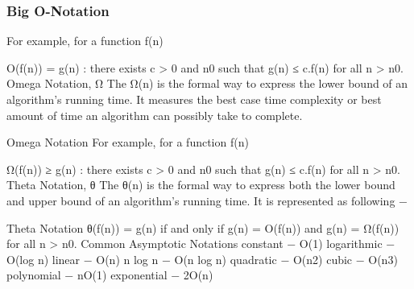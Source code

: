 \documentclass{beamer}
\begin{document}
\begin{frame}
\frametitle{Big O-Notation}
For example, for a function f(n)

Ο(f(n)) = { g(n) : there exists c > 0 and n0 such that g(n) ≤ c.f(n) for all n > n0. }
Omega Notation, Ω
The Ω(n) is the formal way to express the lower bound of an algorithm's running time. It measures the best case time complexity or best amount of time an algorithm can possibly take to complete.
\end{frame}
\begin{frame}
Omega Notation
For example, for a function f(n)

Ω(f(n)) ≥ { g(n) : there exists c > 0 and n0 such that g(n) ≤ c.f(n) for all n > n0. }
Theta Notation, θ
The θ(n) is the formal way to express both the lower bound and upper bound of an algorithm's running time. It is represented as following −
\end{frame}
\begin{frame}
Theta Notation
θ(f(n)) = { g(n) if and only if g(n) =  Ο(f(n)) and g(n) = Ω(f(n)) for all n > n0. }
Common Asymptotic Notations
constant	−	Ο(1)
logarithmic	−	Ο(log n)
linear	−	Ο(n)
n log n	−	Ο(n log n)
quadratic	−	Ο(n2)
cubic	−	Ο(n3)
polynomial	−	nΟ(1)
exponential	−	2Ο(n)

\end{frame}

\end{document}
